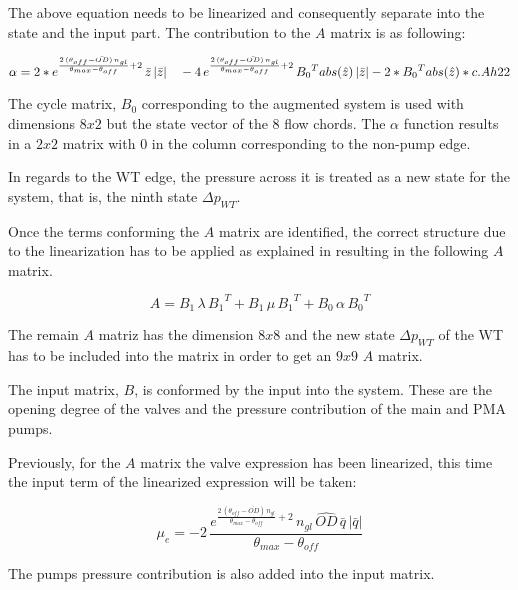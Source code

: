 The above equation needs to be linearized and consequently separate into the state and the input part. The contribution to the $A$ matrix is as 
following:

\begin{equation}
  \alpha = 2 * e^{\frac{2 \, (\theta_{off} - \bar{OD}) \, n_{gl}}{\theta_{max}-\theta_{off}}+2} \, \bar{z} \, |\bar{z}| \quad - \\
  4 \, e^{\frac{2 \, (\theta_{off} - \bar{OD}) \, n_{gl}}{\theta_{max}-\theta_{off}}+2} \, {B_0}^{T} abs(\hat{z}) \, |\bar{z}| - 2 * {B_0}^{T} abs(\hat{z}) * c.Ah22
\end{equation}

The cycle matrix, $B_0$ corresponding to the augmented system is used with dimensions $8x2$ but the state vector of the 8 flow chords.
 The $\alpha$ function results in a $2x2$ matrix with $0$ in the column corresponding to the non-pump edge. 

In regards to the WT edge, the pressure across it is treated as a new state for the system, that is, the ninth state $\Delta p_{WT}$. 

Once the terms conforming the $A$ matrix are identified, the correct structure due to the linearization has to be applied as explained in \secref{} resulting in
the following $A$ matrix.

\begin{equation}
  A = B_1 \, \lambda \, {B_1}^T + B_1 \, \mu \, {B_1}^T + B_0 \, \alpha \, {B_0}^T
\end{equation}

The remain $A$ matriz has the dimension $8x8$ and the new state $\Delta p_{WT}$ of the WT has to be included into the matrix in order to get an $9x9$ $A$ 
matrix. 

The input matrix, $B$, is conformed by the input into the system. These are the opening degree of the valves and the pressure contribution of the main 
and PMA pumps. 

Previously, for the $A$ matrix the valve expression has been linearized, this time the input term of the linearized expression will be taken:

\begin{equation}
  {\mu}_e = -2 \, \frac{e^{\frac{2 \, (\theta_{off} - \bar{OD}) \, n_{gl}}{\theta_{max}-\theta_{off}}+2}
   \, n_{gl} \, \hat{OD} \, \bar{q} \, |\bar{q}|}{\theta_{max}-\theta_{off}}
\end{equation}

The pumps pressure contribution is also added into the input matrix. 



